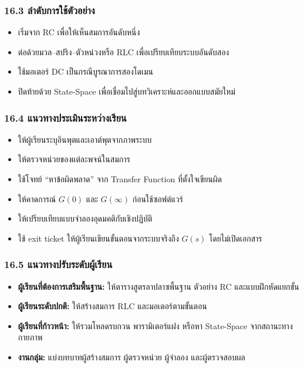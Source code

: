 \subsubsection{16.3 ลำดับการใช้ตัวอย่าง}

\begin{itemize}
    \item เริ่มจาก RC เพื่อให้เห็นสมการอันดับหนึ่ง
    \item ต่อด้วยมวล–สปริง–ตัวหน่วงหรือ RLC เพื่อเปรียบเทียบระบบอันดับสอง
    \item ใช้มอเตอร์ DC เป็นกรณีบูรณาการสองโดเมน
    \item ปิดท้ายด้วย State-Space เพื่อเชื่อมไปสู่บทวิเคราะห์และออกแบบสมัยใหม่
\end{itemize}

\subsubsection{16.4 แนวทางประเมินระหว่างเรียน}

\begin{itemize}
    \item ให้ผู้เรียนระบุอินพุตและเอาต์พุตจากภาพระบบ
    \item ให้ตรวจหน่วยของแต่ละพจน์ในสมการ
    \item ใช้โจทย์ “หาข้อผิดพลาด” จาก Transfer Function ที่ตั้งใจเขียนผิด
    \item ให้คาดการณ์ $G(0)$ และ $G(\infty)$ ก่อนใช้ซอฟต์แวร์
    \item ให้เปรียบเทียบแบบจำลองอุดมคติกับเชิงปฏิบัติ
    \item ใช้ exit ticket ให้ผู้เรียนเขียนขั้นตอนจากระบบจริงถึง $G(s)$ โดยไม่เปิดเอกสาร
\end{itemize}

\subsubsection{16.5 แนวทางปรับระดับผู้เรียน}

\begin{itemize}
    \item \textbf{ผู้เรียนที่ต้องการเสริมพื้นฐาน:} ให้ตารางสูตรลาปลาซพื้นฐาน ตัวอย่าง RC และแบบฝึกหัดแยกขั้น
    \item \textbf{ผู้เรียนระดับปกติ:} ให้สร้างสมการ RLC และมอเตอร์ตามขั้นตอน
    \item \textbf{ผู้เรียนที่ก้าวหน้า:} ให้รวมโหลดรบกวน พารามิเตอร์แฝง หรือหา State-Space จากสถานะทางกายภาพ
    \item \textbf{งานกลุ่ม:} แบ่งบทบาทผู้สร้างสมการ ผู้ตรวจหน่วย ผู้จำลอง และผู้ตรวจสอบผล
\end{itemize}

